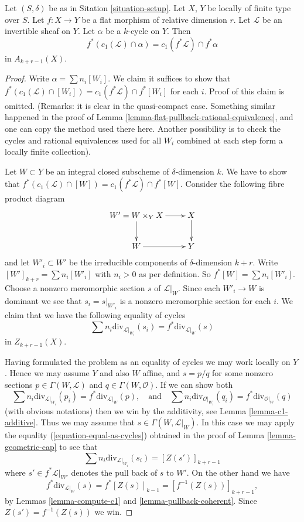 \begin{lemma}
\label{lemma-flat-pullback-cap-c1}
Let $(S, \delta)$ be as in Sitation \ref{situation-setup}.
Let $X$, $Y$ be locally of finite type over $S$.
Let $f : X \to Y$ be a flat morphism of relative dimension $r$.
Let $\mathcal{L}$ be an invertible sheaf on $Y$.
Let $\alpha$ be a $k$-cycle on $Y$.
Then
$$
f^*(c_1(\mathcal{L}) \cap \alpha) = c_1(f^*\mathcal{L}) \cap f^*\alpha
$$
in $A_{k + r - 1}(X)$.
\end{lemma}

\begin{proof}
Write $\alpha = \sum n_i[W_i]$. We claim it suffices to show that
$f^*(c_1(\mathcal{L}) \cap [W_i]) = c_1(f^*\mathcal{L}) \cap f^*[W_i]$
for each $i$. Proof of this claim is omitted.
(Remarks: it is clear in the quasi-compact case.
Something similar happened in the proof of
Lemma \ref{lemma-flat-pullback-rational-equivalence}, and one
can copy the method used there here. Another possibility
is to check the cycles and rational equivalences used
for all $W_i$ combined at each step form a locally finite collection).

\medskip\noindent
Let $W \subset Y$ be an integral closed subscheme of $\delta$-dimension $k$.
We have to show that
$f^*(c_1(\mathcal{L}) \cap [W]) = c_1(f^*\mathcal{L}) \cap f^*[W]$.
Consider the following fibre product diagram
$$
\xymatrix{
W' = W \times_Y X \ar[r] \ar[d] & X \ar[d] \\
W \ar[r] & Y
}
$$
and let $W'_i \subset W'$ be the irreducible components of
$\delta$-dimension $k + r$. Write
$[W']_{k + r} = \sum n_i[W'_i]$ with $n_i > 0$ as per definition.
So $f^*[W] = \sum n_i[W'_i]$. Choose a nonzero meromorphic section
$s$ of $\mathcal{L}|_W$. Since each $W'_i \to W$ is dominant we
see that $s_i = s|_{W'_i}$ is a nonzero meromorphic section for
each $i$. We claim that we have the following equality of
cycles
$$
\sum n_i\text{div}_{\mathcal{L}|_{W_i}}(s_i)
=
f^*\text{div}_{\mathcal{L}|_W}(s)
$$
in $Z_{k + r - 1}(X)$.

\medskip\noindent
Having formulated the problem as an equality of cycles
we may work locally on $Y$. Hence we may assume
$Y$ and also $W$ affine, and $s = p/q$ for some
nonzero sections $p \in \Gamma(W, \mathcal{L})$
and $q \in \Gamma(W, \mathcal{O})$. If we can show both
$$
\sum n_i\text{div}_{\mathcal{L}|_{W_i}}(p_i)
=
f^*\text{div}_{\mathcal{L}|_W}(p),
\quad\text{and}\quad
\sum n_i\text{div}_{\mathcal{O}|_{W_i}}(q_i)
=
f^*\text{div}_{\mathcal{O}|_W}(q)
$$
(with obvious notations) then we win by the
additivity, see Lemma \ref{lemma-c1-additive}.
Thus we may assume that $s \in \Gamma(W, \mathcal{L}|_W)$.
In this case we may apply the equality
(\ref{equation-equal-as-cycles}) obtained in the proof of
Lemma \ref{lemma-geometric-cap} to see that
$$
\sum n_i\text{div}_{\mathcal{L}|_{W_i}}(s_i)
=
[Z(s')]_{k + r - 1}
$$
where $s' \in f^*\mathcal{L}|_{W'}$ denotes the pull back
of $s$ to $W'$. On the other hand we have
$$
f^*\text{div}_{\mathcal{L}|_W}(s) = f^*[Z(s)]_{k - 1}
= [f^{-1}(Z(s))]_{k + r - 1},
$$
by Lemmas \ref{lemma-compute-c1} and \ref{lemma-pullback-coherent}. 
Since $Z(s') = f^{-1}(Z(s))$ we win.
\end{proof}


